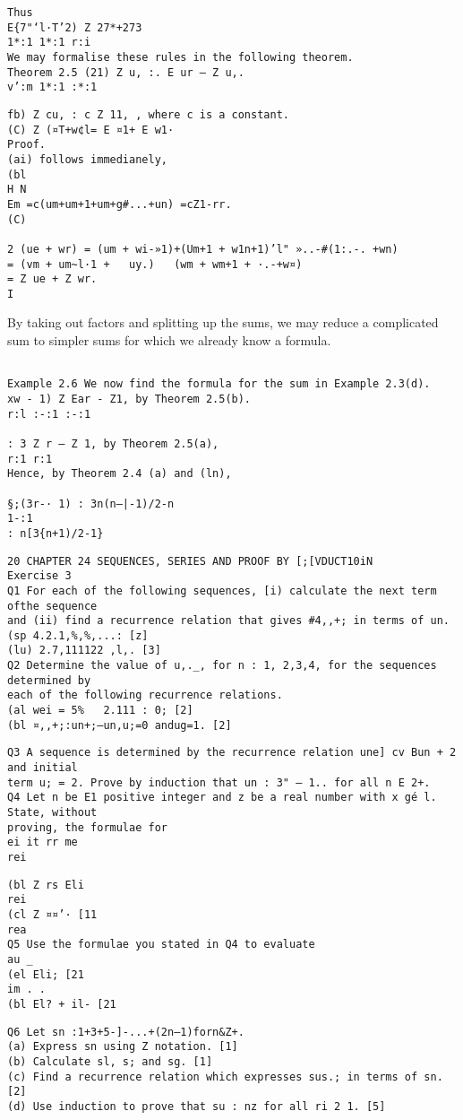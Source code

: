 \documentclass[]{article}
\begin{document}
\begin{verbatim}
Thus
E{7"‘l·T’2) Z 27*+273
1*:1 1*:1 r:i
We may formalise these rules in the following theorem.
Theorem 2.5 (21) Z u, :. E ur — Z u,.
v’:m 1*:1 :*:1
\end{verbatim}
\begin{verbatim}  
fb) Z cu, : c Z 11, , where c is a constant.
(C) Z (¤T+w¢l= E ¤1+ E w1·
Proof.
(ai) follows immedianely,
(bl
H N
Em =c(um+um+1+um+g#...+un) =cZ1-rr.
(C)
 
2 (ue + wr) = (um + wi-»1)+(Um+1 + w1n+1)’l" »..-#(1:.-. +wn)
= (vm + um~l·1 +   uy.)   (wm + wm+1 + ·.-+w¤)
= Z ue + Z wr.
I
\end{verbatim}
By taking out factors and splitting up the sums, we may reduce a complicated
sum to simpler sums for which we already know a formula.
\begin{verbatim}

Example 2.6 We now find the formula for the sum in Example 2.3(d).
xw - 1) Z Ear - Z1, by Theorem 2.5(b).
r:l :-:1 :-:1
   
: 3 Z r — Z 1, by Theorem 2.5(a),
r:1 r:1
Hence, by Theorem 2.4 (a) and (ln),
 
§;(3r-· 1) : 3n(n—|-1)/2-n
1-:1
: n[3{n+1)/2-1}
\end{verbatim}
\begin{verbatim}
20 CHAPTER 24 SEQUENCES, SERIES AND PROOF BY [;[VDUCT10iN
Exercise 3
Q1 For each of the following sequences, [i) calculate the next term ofthe sequence
and (ii) find a recurrence relation that gives #4,,+; in terms of un.
(sp 4.2.1,%,%,...: [z]
(lu) 2.7,111122 ,l,. [3]
Q2 Determine the value of u,._, for n : 1, 2,3,4, for the sequences determined by
each of the following recurrence relations.
(al wei = 5%   2.111 : 0; [2]
(bl ¤,,+;:un+;—un,u;=0 andug=1. [2]
\end{verbatim}
\begin{verbatim}
Q3 A sequence is determined by the recurrence relation une] cv Bun + 2 and initial
term u; = 2. Prove by induction that un : 3" — 1.. for all n E 2+.  
Q4 Let n be E1 positive integer and z be a real number with x gé l. State, without
proving, the formulae for
ei it rr me
rei
 \end{verbatim}
 \begin{verbatim}
(bl Z rs Eli
rei
(cl Z ¤¤’· [11
rea
Q5 Use the formulae you stated in Q4 to evaluate
au _
(el Eli; [21
im . .
(bl El? + il- [21
\end{verbatim}
\begin{verbatim}
Q6 Let sn :1+3+5-]-...+(2n—1)forn&Z+.
(a) Express sn using Z notation. [1]
(b) Calculate sl, s; and sg. [1]
(c) Find a recurrence relation which expresses sus.; in terms of sn. [2]
(d) Use induction to prove that su : nz for all ri 2 1. [5]
\end{verbatim}
\end{document}
